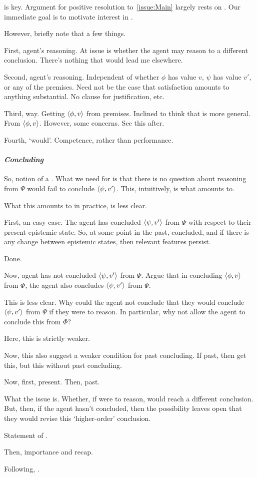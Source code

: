 \begin{note}
  \csN{} is key.
  Argument for positive resolution to~\autoref{issue:Main} largely rests on \csN{}.
  Our immediate goal is to motivate interest in \csN{}.

  However, briefly note that a few things.

  First, agent's reasoning.
  At issue is whether the agent may reason to a different conclusion.
  There's nothing that would lead me elsewhere.

  Second, agent's reasoning.
  Independent of whether \(\phi\) has value \(v\), \(\psi\) has value \(v'\), or any of the premises.
  Need not be the case that satisfaction amounts to anything substantial.
  No clause for justification, etc.

  Third, way.
  Getting \(\langle \phi, v \rangle\) from premises.
  Inclined to think that \csN{} is more general.
  From \(\langle \phi, v \rangle\).
  However, some concerns.
  See this after.

  Fourth, `would'.
  Competence, rather than performance.
\end{note}

\paragraph*{\emph{Concluding}}

{
  \color{blue}
  So, notion of a \requ{}.
  What we need for \csN{} is that there is no question about reasoning from \(\Psi\) would fail to conclude \(\langle \psi, v' \rangle\).
  This, intuitively, is what \csN{} amounts to.

  What this amounts to in practice, is less clear.

  First, an easy case.
  The agent has concluded \(\langle \psi, v' \rangle\) from \(\Psi\) with respect to their present epistemic state.
  So, at some point in the past, concluded, and if there is any change between epistemic states, then relevant features persist.

  Done.

  Now, agent has not concluded \(\langle \psi, v' \rangle\) from \(\Psi\).
  Argue that in concluding \(\langle \phi, v \rangle\) from \(\Phi\), the agent also concludes \(\langle \psi, v' \rangle\) from \(\Psi\).

  This is less clear.
  Why could the agent not conclude that they would conclude \(\langle \psi, v' \rangle\) from \(\Psi\) if they were to reason.
  In particular, why not allow the agent to conclude this from \(\Phi\)?

  Here, this is strictly weaker.

  Now, this also suggest a weaker condition for past concluding.
  If past, then get this, but this without past concluding.

  Now, first, present.
  Then, past.

  What the issue is.
  Whether, if were to reason, would reach a different conclusion.
  But, then, if the agent hasn't concluded, then the possibility leaves open that they would revise this `higher-order' conclusion.

  Statement of \iCS{}.

  Then, importance and recap.

  Following, .
}

